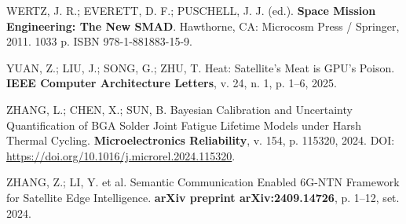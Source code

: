 \vspace{0.2cm}
\noindent WERTZ, J. R.; EVERETT, D. F.; PUSCHELL, J. J. (ed.). \textbf{Space Mission Engineering: The New SMAD}. Hawthorne, CA: Microcosm Press / Springer, 2011. 1033 p. ISBN 978-1-881883-15-9.

\vspace{0.2cm}
\noindent YUAN, Z.; LIU, J.; SONG, G.; ZHU, T. Heat: Satellite's Meat is GPU's Poison. \textbf{IEEE Computer Architecture Letters}, v. 24, n. 1, p. 1--6, 2025.

\vspace{0.2cm}
\noindent ZHANG, L.; CHEN, X.; SUN, B. Bayesian Calibration and Uncertainty Quantification of BGA Solder Joint Fatigue Lifetime Models under Harsh Thermal Cycling. \textbf{Microelectronics Reliability}, v. 154, p. 115320, 2024. DOI: \url{https://doi.org/10.1016/j.microrel.2024.115320}.

\vspace{0.2cm}
\noindent ZHANG, Z.; LI, Y. et al. Semantic Communication Enabled 6G-NTN Framework for Satellite Edge Intelligence. \textbf{arXiv preprint arXiv:2409.14726}, p. 1--12, set. 2024.

\endgroup
